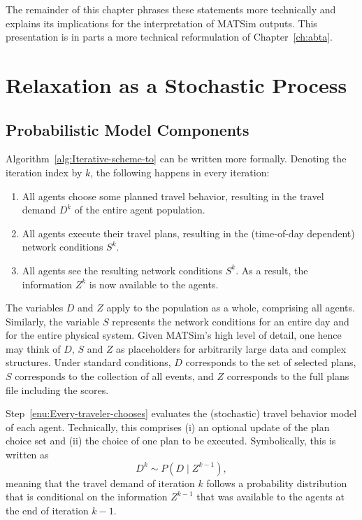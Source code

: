 The remainder of this chapter phrases these statements more technically and explains 
its implications for the interpretation of MATSim outputs.  This presentation is in parts a 
more technical reformulation of Chapter~\ref{ch:abta}.


\section{\label{sec:Relaxation-as-a}Relaxation as a Stochastic Process}


\subsection{\label{sub:Probabilistic-model-components}Probabilistic Model Components}

Algorithm~\ref{alg:Iterative-scheme-to} can be written more formally.
Denoting the iteration index by $k$, the following happens in every
iteration:
\begin{enumerate}
\item \label{enu:Every-traveler-chooses}All agents choose some planned
travel behavior, resulting in the travel demand $D^{k}$ of the entire
agent population.
\item \label{enu:All-travelers-execute}All agents execute their travel
plans, resulting in the (time-of-day dependent) network conditions
$S^{k}$.
\item \label{enu:All-travelers-observe}All agents see the resulting network
conditions $S^{k}$. As a result, the information $Z^{k}$ is now
available to the agents.
\end{enumerate}
The variables $D$ and $Z$ apply to the population as a whole, comprising
all agents. Similarly, the variable $S$ represents the network conditions
for an entire day and for the entire physical system. Given MATSim's
high level of detail, one hence may think of $D$, $S$ and $Z$ as
placeholders for arbitrarily large data and complex structures.
Under standard conditions, $D$ corresponds to the set of selected plans, 
$S$ corresponds to the collection of all events, 
and $Z$ corresponds to the full plans file including the scores.

Step~\ref{enu:Every-traveler-chooses} evaluates the (stochastic)
travel behavior model of each agent. Technically, this comprises (i)
an optional update of the plan choice set and (ii) the choice of one
plan to be executed. Symbolically, this is written as
\begin{equation}
D^{k}\sim P(D\mid Z^{k-1}),\label{eq:choice-model}
\end{equation}
meaning that the travel demand of iteration $k$ follows a probability
distribution that is conditional on the information $Z^{k-1}$ that
was available to the agents at the end of iteration $k-1$.

